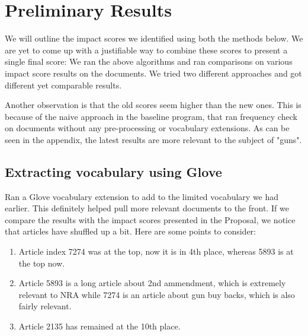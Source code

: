 \documentclass{article}
\begin{document}
 \maketitle
\section{Preliminary Results} %
We will outline the impact scores we identified using both the methods below. We are yet to come up with a justifiable way to combine these scores to present a single final score:
We ran the above algorithms and ran comparisons on various impact score results on the documents.
We tried two different approaches and got different yet comparable results.

Another observation is that the old scores seem higher than the new ones. This is because of the naive approach in the baseline program, that ran frequency check on documents without any pre-processing or vocabulary extensions. As can be seen in the appendix, the latest results are more relevant to the subject of "guns".

\subsection{Extracting vocabulary using Glove}
Ran a Glove vocabulary extension to add to the limited vocabulary we had earlier. This definitely helped pull more relevant documents to the front.
If we compare the results with the impact scores presented in the Proposal, we notice that articles have shuffled up a bit. Here are some points to consider:
\begin {enumerate}
\item Article index 7274 was at the top, now it is in 4th place, whereas 5893 is at the top now.
\item Article 5893 is a long article about 2nd ammendment, which is extremely relevant to NRA while 7274 is an article about gun buy backs, which is also fairly relevant.
\item Article 2135 has remained at the 10th place.
\end {enumerate}
\end{document}

